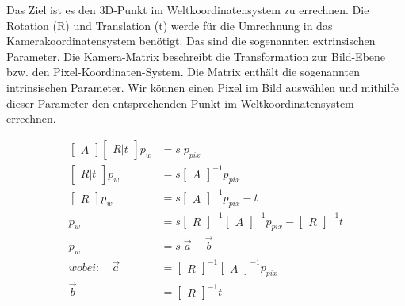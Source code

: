 		Das Ziel ist es den 3D-Punkt im Weltkoordinatensystem zu errechnen. Die Rotation (R) und Translation (t) werde für die Umrechnung in das Kamerakoordinatensystem benötigt. Das sind die sogenannten extrinsischen Parameter. Die Kamera-Matrix beschreibt die Transformation zur Bild-Ebene bzw. den Pixel-Koordinaten-System. Die Matrix enthält die sogenannten intrinsischen Parameter. Wir können einen Pixel im Bild auswählen und mithilfe dieser Parameter den entsprechenden Punkt im Weltkoordinatensystem errechnen.
		
		\begin{equation}
			\begin{aligned}
				 \begin{bmatrix} A \end{bmatrix} \begin{bmatrix} R|t \end{bmatrix} p_w &= s \; p_{pix} \\
				 \begin{bmatrix} R|t \end{bmatrix} p_w &= s \begin{bmatrix} A \end{bmatrix}^{-1} p_{pix} \\
				 \begin{bmatrix} R \end{bmatrix} p_w &= s \begin{bmatrix} A \end{bmatrix}^{-1} p_{pix} - t \\
				 p_w &= s \begin{bmatrix} R \end{bmatrix}^{-1} \begin{bmatrix} A \end{bmatrix}^{-1} p_{pix} - \begin{bmatrix} R \end{bmatrix}^{-1} t \\
				 p_w &= s \; \vec{a} - \vec{b} \\
				 wobei: \quad \vec{a} & = \begin{bmatrix} R \end{bmatrix}^{-1} \begin{bmatrix} A \end{bmatrix}^{-1} p_{pix} \\
				 \vec{b} &= \begin{bmatrix} R \end{bmatrix}^{-1} t
			\end{aligned}
			\label{eq:pixel_zu_welt}
		\end{equation}
		

